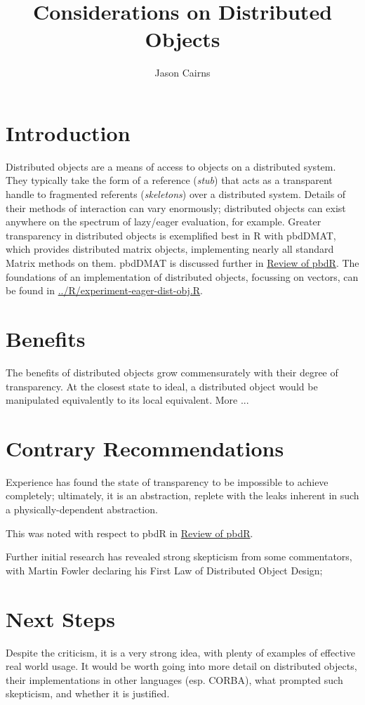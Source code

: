 \documentclass[a4paper,10pt]{article}
\begin{document}
\title{Considerations on Distributed Objects}
\author{Jason Cairns}
  
\maketitle

\section{Introduction}

Distributed objects are a means of access to objects on a distributed system.
They typically take the form of a reference (\textit{stub}) that acts as a transparent
handle to fragmented referents (\textit{skeletons}) over a distributed system.
Details of their methods of interaction can vary enormously; distributed
objects can exist anywhere on the spectrum of lazy/eager evaluation, for
example.
Greater transparency in distributed objects is exemplified best in R with
pbdDMAT, which provides distributed matrix objects, implementing nearly all
standard Matrix methods on them. 
pbdDMAT is discussed further in \href{review-pbdr.pdf}{Review of pbdR}.
The foundations of an implementation of distributed objects, focussing on
vectors, can be found in
\href{../R/experiment-eager-dist-obj.R}{../R/experiment-eager-dist-obj.R}.

\section{Benefits}

The benefits of distributed objects grow commensurately with their degree of
transparency.
At the closest state to ideal, a distributed object would be manipulated
equivalently to its local equivalent.
More ...

\section{Contrary Recommendations}
Experience has found the state of transparency to be impossible to achieve
completely; ultimately, it is an abstraction, replete with the leaks inherent
in such a physically-dependent abstraction.

This was noted with respect to pbdR in \href{review-pbdr.pdf}{Review of pbdR}.

Further initial research has revealed strong skepticism from some
commentators\cite{waldo1996note}\cite{rotem2006fallacies},
with Martin Fowler declaring his First Law of Distributed Object Design;


\section{Next Steps}

Despite the criticism, it is a very strong idea, with plenty of examples of
effective real world usage.  
It would be worth going into more detail on distributed objects, their
implementations in other languages (esp. CORBA), what prompted such skepticism,
and whether it is justified.

\printbibliography{}
\end{document}
